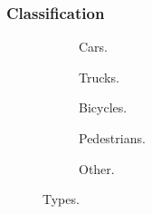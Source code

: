 \subsubsection{Classification}
\begin{figure}[!h]
	\centering
	\begin{subfigure}[!h]{0.25\textwidth}
	
	\caption{Cars.}
	\end{subfigure}
	\quad
	\begin{subfigure}[!h]{0.25\textwidth}
	
	\caption{Trucks.}
	\end{subfigure}
	\quad
	\begin{subfigure}[!h]{0.21\textwidth}
	
	\caption{Bicycles.}
	\end{subfigure}
	\hfill
	\begin{subfigure}[!h]{0.3\textwidth}
	
	\caption{Pedestrians.}
	\end{subfigure}
	\quad
	\begin{subfigure}[!h]{0.5\textwidth}
	
	\caption{Other.}
	\end{subfigure}

	\caption{Types.\label{fig:types}}
\end{figure}



